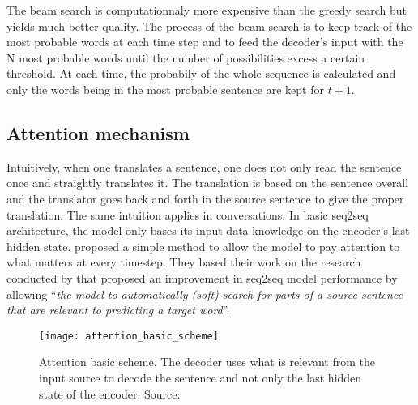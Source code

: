 The beam search is computationnaly more expensive than the greedy search but yields much better quality. The process of the beam search is to keep track of the most probable words at each time step and to feed the decoder's input with the N most probable words until the number of possibilities excess a certain threshold. At each time, the probabily of the whole sequence is calculated and only the words being in the most probable sentence are kept for $t+1$.


\subsection{Attention mechanism}
Intuitively, when one translates a sentence, one does not only read the sentence once and straightly translates it. The translation is based on the sentence overall and the translator goes back and forth in the source sentence to give the proper translation. The same intuition applies in conversations.
In basic seq2seq architecture, the model only bases its input data knowledge on the encoder's last hidden state. \citet{1508.04025} proposed a simple method to allow the model to pay attention to what matters at every timestep. They based their work on the research conducted by \citet{1409.0473} that proposed an improvement in seq2seq model performance by allowing ``\textit{the model to automatically (soft)-search for parts of a source sentence that are relevant to predicting a target word}''.

\begin{figure}
    \centering
    \texttt{[image: attention\_basic\_scheme]}
    \decoRule
    \caption[Attention basic scheme]{Attention basic scheme. The decoder uses what is relevant from the input source to decode the sentence and not only the last hidden state of the encoder. Source:~\citet{youtube-nmt-attention}}
    \label{fig:attention_basic_scheme}
\end{figure}

